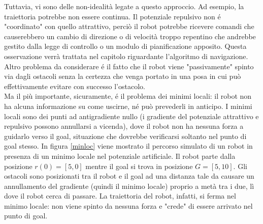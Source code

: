 \documentclass[14pt,a4paper]{extarticle}
\begin{document}
Tuttavia, vi sono delle non-idealità legate a questo approccio. Ad esempio, la traiettoria potrebbe non essere continua. Il potenziale repulsivo non é "coordinato" con quello attrattivo, perciò il robot potrebbe ricevere comandi che causerebbero un cambio di direzione o di velocità troppo repentino che andrebbe gestito dalla legge di controllo o un modulo di pianificazione apposito. Questa osservazione verrà trattata nel capitolo riguardante l'algoritmo di navigazione. \\
Altro problema da considerare é il fatto che il robot viene "passivamente" spinto via dagli ostacoli senza la certezza che venga portato in una posa in cui può effettivamente evitare con successo l'ostacolo.\\
Ma il più importante, sicuramente, é il problema dei minimi locali: il robot non ha alcuna informazione su come uscirne, né può prevederli in anticipo. I minimi locali sono dei punti ad antigradiente nullo (i gradiente del potenziale attrattivo e repulsivo possono annullarsi a vicenda), dove il robot non ha nessuna forza a guidarlo verso il goal, situazione che dovrebbe verificarsi soltanto nel punto di goal stesso. In figura \ref{minloc} viene mostrato il percorso simulato di un robot in presenza di un minimo locale nel potenziale artificiale. Il robot parte dalla posizione \(r(0) = [5,0]\) mentre il goal si trova in posizione \(G = [5,10]\). Gli ostacoli sono posizionati tra il robot e il goal ad una distanza tale da causare un annullamento del gradiente (quindi il minimo locale) proprio a metà tra i due, lì dove il robot cerca di passare. La traiettoria del robot, infatti, si ferma nel minimo locale: non viene spinto da nessuna forza e "crede" di essere arrivato nel punto di goal.
\end{document}
